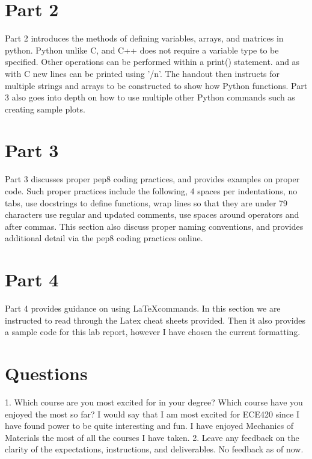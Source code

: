 \documentclass[12pt]{report}
\begin{document}
\section{Part 2}
Part 2 introduces the methods of defining variables, arrays, and matrices in python. Python unlike C, and C++ does not require a variable type to be specified. Other operations can be performed within a print() statement. and as with C new lines can be printed using '/n'. The handout then instructs for multiple strings and arrays to be constructed to show how Python functions. Part 3 also goes into depth on how to use multiple other Python commands such as creating sample plots.  
\section{Part 3}
Part 3 discusses proper pep8 coding practices, and provides examples on proper code. Such proper practices include the following, 4 spaces per indentations, no tabs, use docstrings to define functions, wrap lines so that they are under 79 characters use regular and updated comments, use spaces around operators and after commas.
This section also discuss proper naming conventions, and provides additional detail via the pep8 coding practices online. 
\section{Part 4}
Part 4 provides guidance on using \LaTeX  commands. In this section we are instructed to read through the Latex cheat sheets provided. Then it also provides a sample code for this lab report, however I have chosen the current formatting.  
\section{Questions}
1. Which course are you most excited for in your degree? Which course have you enjoyed the most so far?
I would say that I am most excited for ECE420 since I have found power to be quite interesting and fun. I have enjoyed Mechanics of Materials the most of all the courses I have taken. 
2. Leave any feedback on the clarity of the expectations, instructions, and deliverables.
No feedback as of now. 
\end{document}
